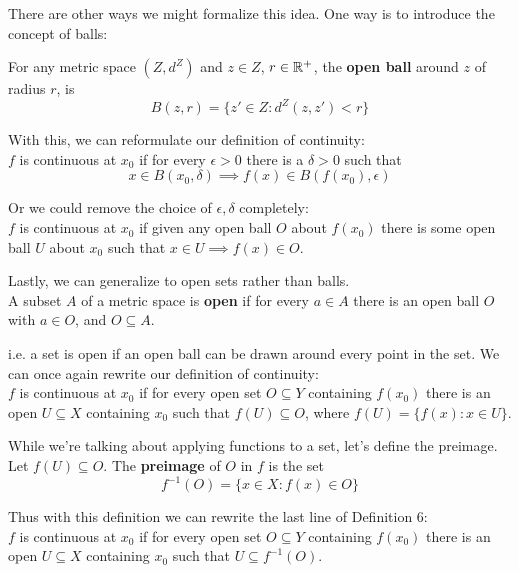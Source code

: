 \documentclass[11pt]{article}
\begin{document}
There are other ways we might formalize this idea. One way is to introduce the concept of balls:

 For any metric space $(Z, d^Z)$ and $z \in Z$, $r \in \mathbb{R}^+$, the \textbf{open ball} around $z$ of radius $r$, is
\[B(z, r) = \{z' \in Z : d^Z(z, z') < r\}\]

With this, we can reformulate our definition of continuity:\\
 $f$ is continuous at $x_0$ if for every $\epsilon > 0$ there is a $\delta > 0$ such that
\[x \in B(x_0, \delta) \implies f(x) \in B(f(x_0), \epsilon)\]

Or we could remove the choice of $\epsilon, \delta$ completely:\\
 $f$ is continuous at $x_0$ if given any open ball $O$ about $f(x_0)$ there is some open ball $U$ about $x_0$ such that $x \in U \implies f(x) \in O$.

Lastly, we can generalize to open sets rather than balls.\\
 A subset $A$ of a metric space is \textbf{open} if for every $a \in A$ there is an open ball $O$ with $a \in O$, and $O \subseteq A$.

i.e. a set is open if an open ball can be drawn around every point in the set. We can once again rewrite our definition of continuity:\\
 $f$ is continuous at $x_0$ if for every open set $O \subseteq Y$ containing $f(x_0)$ there is an open $U \subseteq X$ containing $x_0$ such that $f(U) \subseteq O$, where $f(U) = \{f(x) : x \in U\}$.

While we're talking about applying functions to a set, let's define the preimage.\\
 Let $f(U) \subseteq O$. The \textbf{preimage} of $O$ in $f$ is the set
\[f^{-1}(O) = \{x \in X : f(x) \in O\}\]

Thus with this definition we can rewrite the last line of Definition 6:\\
 $f$ is continuous at $x_0$ if for every open set $O \subseteq Y$ containing $f(x_0)$ there is an open $U \subseteq X$ containing $x_0$ such that $U \subseteq f^{-1}(O)$.
\end{document}
